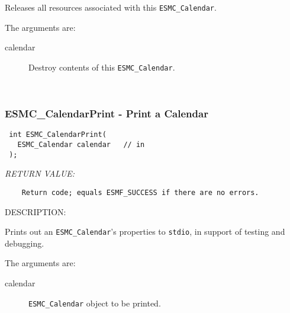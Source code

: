   
    Releases all resources associated with this {\tt ESMC\_Calendar}.
  
    The arguments are:
    \begin{description}
    \item[calendar]
      Destroy contents of this {\tt ESMC\_Calendar}.
    \end{description}
   
 
\mbox{}\hrulefill\ 
 
\subsubsection [ESMC\_CalendarPrint] {ESMC\_CalendarPrint - Print a Calendar}


  
\begin{verbatim} int ESMC_CalendarPrint(
   ESMC_Calendar calendar   // in
 );
 \end{verbatim}{\em RETURN VALUE:}
\begin{verbatim}    Return code; equals ESMF_SUCCESS if there are no errors.\end{verbatim}
{\sf DESCRIPTION:\\ }


    Prints out an {\tt ESMC\_Calendar}'s properties to {\tt stdio}, 
    in support of testing and debugging.
  
    The arguments are:
    \begin{description}
    \item[calendar]
      {\tt ESMC\_Calendar} object to be printed.
    \end{description}
  
\setlength{\parskip}{\oldparskip}
\setlength{\parindent}{\oldparindent}
\setlength{\baselineskip}{\oldbaselineskip}

